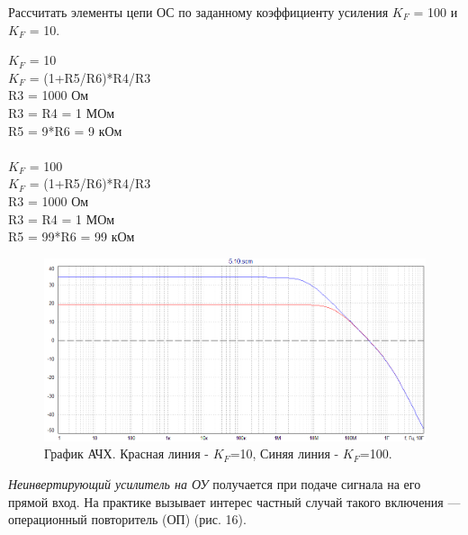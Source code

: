 \documentclass[a4paper,14pt]{extarticle}
\begin{document}
    Рассчитать элементы цепи ОС по заданному коэффициенту усиления $K_F$ = 100
    и $K_F$ = 10.
    \begin{multicols}{2}
        \begin{tabbing}
            \noindent $K_F$ = 10\=\\
            \>$K_F$ = (1+R5/R6)*R4/R3\\
            \>R3 = 1000 Ом\\
            \>R3 = R4 = 1 МОм\\
            \>R5 = 9*R6 = 9 кОм\\\\

            $K_F$ = 100\=\\
            \>$K_F$ = (1+R5/R6)*R4/R3\\
            \>R3 = 1000 Ом\\
            \>R3 = R4 = 1 МОм\\
            \>R5 = 99*R6 = 99 кОм\\
        \end{tabbing}
    \end{multicols}
    \begin{figure}[h!]
        \begin{center}
            \includegraphics[scale=0.5]{13.png}
        \end{center}
        \vspace{-0.7cm}
        \caption{График АЧХ. Красная линия - $K_F$=10, Синяя линия - $K_F$=100.}
    \end{figure}
   
    \emph{Неинвертирующий усилитель на ОУ} получается при подаче сигнала 
    на его прямой вход. На практике вызывает интерес частный случай 
    такого включения — операционный повторитель (ОП) (рис. 16).
\end{document}
